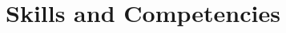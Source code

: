 \documentclass[10pt,a4paper,svgnames]{article}
\newcommand{\sepa}{$\cdot$~}
\newcommand{\role}[1]{\textbf{#1}}
\newcommand{\montant}{\rule{0pt}{.5cm}}
\begin{document}
\begin{tabular}{p{.065\linewidth} p{0.45\linewidth} p{0.415\linewidth}}


\end{tabular}


\section*{Skills and Competencies}
\end{document}
